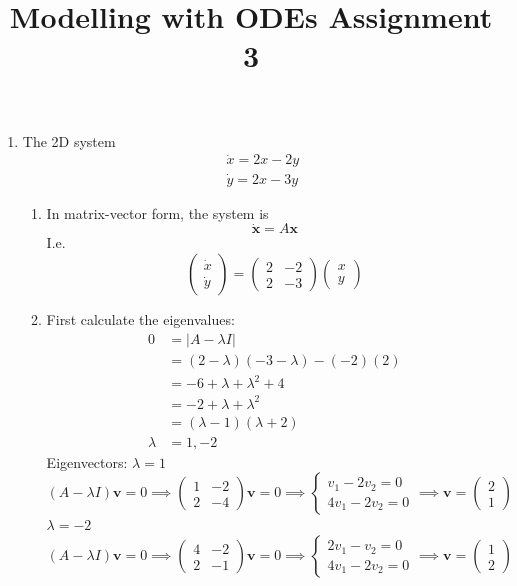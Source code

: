 \documentclass{/home/janmebows/Documents/LatexTemplates/myassignment}
\title{Modelling with ODEs Assignment 3}
\begin{document}
\maketitle

\begin{enumerate}
	\item The 2D system
	\begin{align*}
		\dot{x} = 2x - 2y\\
		\dot{y} = 2x - 3y
	\end{align*}
	\begin{enumerate}
		\item In matrix-vector form, the system is
		\[\mathbf{\dot{x}} = A \mathbf{x}\]
		I.e.
		\[\begin{pmatrix}\dot x\\\dot y\end{pmatrix}
		= 
		\begin{pmatrix}2&-2\\2&-3\end{pmatrix} \begin{pmatrix}x\\y\end{pmatrix}\]
		\item %
		First calculate the eigenvalues:
		\begin{align*}
			0&=|A - \lambda I| \\
			&=(2-\lambda)(-3-\lambda) - (-2)(2)\\
			&= -6 +\lambda +\lambda^2 + 4\\
			&= -2 + \lambda + \lambda^2\\
			&=(\lambda -1) (\lambda+2)\\
			\lambda &= 1, -2
		\end{align*}
		Eigenvectors: $\lambda=1$
		\[(A-\lambda I)\mathbf{v} =0 \implies \begin{pmatrix}1&-2\\2&-4\end{pmatrix} \mathbf{v}  =0 \implies \begin{cases}
			v_1 -2 v_2 =0\\
			4v_1 - 2v_2 =0
		\end{cases} \implies \mathbf{v} = \begin{pmatrix}2\\1\end{pmatrix}\]
		$\lambda=-2$
		\[(A-\lambda I)\mathbf{v} =0 \implies \begin{pmatrix}4&-2\\2&-1\end{pmatrix} \mathbf{v}  =0 \implies \begin{cases}
			2v_1 - v_2 =0\\
			4v_1 - 2v_2 =0
		\end{cases} \implies \mathbf{v} = \begin{pmatrix}1\\2\end{pmatrix}\]
			

\end{enumerate}
\end{enumerate}
\end{document}
